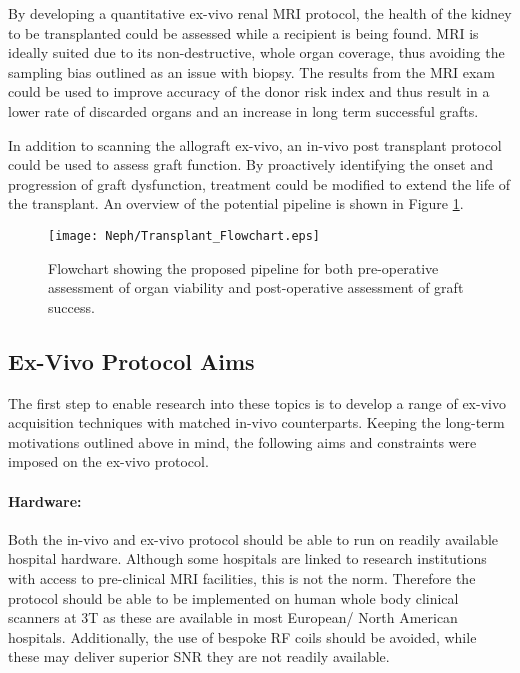 By developing a quantitative ex-vivo renal \ac{MRI} protocol, the health of the kidney to be transplanted could be assessed while a recipient is being found. \ac{MRI} is ideally suited due to its non-destructive, whole organ coverage, thus avoiding the sampling bias outlined as an issue with biopsy. The results from the \ac{MRI} exam could be used to improve accuracy of the donor risk index and thus result in a lower rate of discarded organs and an increase in long term successful grafts. 

In addition to scanning the allograft ex-vivo, an in-vivo post transplant protocol could be used to assess graft function. By proactively identifying the onset and progression of graft dysfunction, treatment could be modified to extend the life of the transplant. An overview of the potential pipeline is shown in Figure \ref{fig:ex_transplant_flowchart}.
\begin{figure}[H]
	\centering
	\texttt{[image: Neph/Transplant\_Flowchart.eps]}
	\caption{Flowchart showing the proposed pipeline for both pre-operative assessment of organ viability and post-operative assessment of graft success.}
	\label{fig:ex_transplant_flowchart}	
\end{figure}

\newpage
\subsection{Ex-Vivo Protocol Aims}

The first step to enable research into these topics is to develop a range of ex-vivo acquisition techniques with matched in-vivo counterparts. Keeping the long-term motivations outlined above in mind, the following aims and constraints were imposed on the ex-vivo protocol.

\paragraph{Hardware:} Both the in-vivo and ex-vivo protocol should be able to run on readily available hospital hardware. Although some hospitals are linked to research institutions with access to pre-clinical \ac{MRI} facilities, this is not the norm. Therefore the protocol should be able to be implemented on human whole body clinical scanners at 3T as these are available in most European/ North American hospitals. Additionally, the use of bespoke \ac{RF} coils should be avoided, while these may deliver superior \ac{SNR} they are not readily available.

